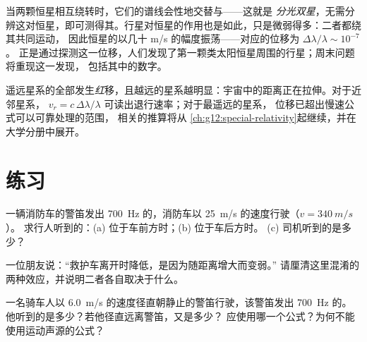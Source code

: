 \begin{example}\label{ex:g12:doppler-effect:wobble}
当两颗恒星相互绕转时，它们的谱线会性地交替与——这就是
\emph{分光双星}，无需分辨这对恒星，即可测得其。行星对恒星的作用也是如此，只是微弱得多：二者都绕其共同运动，
因此恒星的以几十 \unit{m/s} 的幅度振荡——对应的位移为
$\Delta\lambda/\lambda \sim 10^{-7}$。
正是通过探测这一位移，人们发现了第一颗类太阳恒星周围的行星；周末问题将重现这一发现，
包括其中的数字。
\end{example}

\begin{remark}[星系红移]\label{rem:g12:doppler-effect:expansion}
遥远星系的全部发生\emph{红}移，且越远的星系越明显：宇宙中的距离正在拉伸。对于近邻星系，
$v_r = c\,\Delta\lambda/\lambda$ 可读出退行速率；对于最遥远的星系，
位移已超出慢速公式可以可靠处理的范围，
相关的推算将从
\cref{ch:g12:special-relativity}起继续，并在大学分册中展开。
\end{remark}

\section{练习}

\begin{exercise}[$\star$]\label{exo:g12:doppler-effect:1}
一辆消防车的警笛发出 \qty{700}{Hz} 的，消防车以 \qty{25}{m/s} 的速度行驶（$v = \qty{340}{m/s}$）。
求行人听到的：(a) 位于车前方时；(b) 位于车后方时。
(c) 司机听到的是多少？
\end{exercise}

\begin{exercise}[$\star$]\label{exo:g12:doppler-effect:2}
一位朋友说：“救护车离开时降低，是因为随距离增大而变弱。”
请厘清这里混淆的两种效应，并说明二者各自取决于什么。
\end{exercise}

\begin{exercise}[$\star$]\label{exo:g12:doppler-effect:3}
一名骑车人以 \qty{6.0}{m/s} 的速度径直朝静止的警笛行驶，该警笛发出 \qty{700}{Hz} 的。
他听到的是多少？若他径直远离警笛，又是多少？
应使用哪一个公式？为何不能使用运动声源的公式？
\end{exercise}

